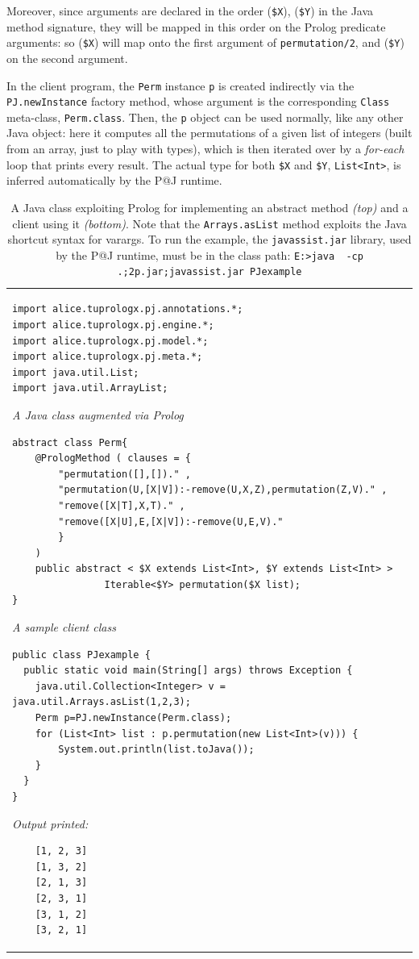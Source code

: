 Moreover, since arguments are declared in the order (\texttt{\$X}), (\texttt{\$Y}) in the Java method signature, they will be mapped in this order on the Prolog predicate arguments: so (\texttt{\$X}) will map onto the first argument of \texttt{permutation/2}, and (\texttt{\$Y}) on the second argument.

In the client program, the \texttt{Perm} instance \texttt{p} is created indirectly via the \texttt{PJ.newInstance} factory method, whose argument is the corresponding \texttt{Class} meta-class, \texttt{Perm.class}.
Then, the \texttt{p} object can be used normally, like any other Java object: here it computes all the permutations of a given list of integers (built from an array, just to play with types), which is then iterated over by a \textit{for-each} loop that prints every result.
The actual type for both \texttt{\$X} and \texttt{\$Y}, \texttt{List<Int>}, is inferred automatically by the P@J runtime.

\begin{table}
{\footnotesize
\begin{tabular}[-1cm]{p{12cm}}
\begin{verbatim}
import alice.tuprologx.pj.annotations.*;
import alice.tuprologx.pj.engine.*;
import alice.tuprologx.pj.model.*;
import alice.tuprologx.pj.meta.*;
import java.util.List;
import java.util.ArrayList;
\end{verbatim}
\textsf{\emph{A Java class augmented via Prolog}}
\begin{verbatim}
abstract class Perm{
    @PrologMethod ( clauses = {
        "permutation([],[])." ,
        "permutation(U,[X|V]):-remove(U,X,Z),permutation(Z,V)." ,
        "remove([X|T],X,T)." ,
        "remove([X|U],E,[X|V]):-remove(U,E,V)."
        }
    )
    public abstract < $X extends List<Int>, $Y extends List<Int> >
                Iterable<$Y> permutation($X list);
}
\end{verbatim}
\textsf{\emph{A sample client class}}
\begin{verbatim}
public class PJexample {
  public static void main(String[] args) throws Exception {
    java.util.Collection<Integer> v = java.util.Arrays.asList(1,2,3);
    Perm p=PJ.newInstance(Perm.class);
    for (List<Int> list : p.permutation(new List<Int>(v))) {
        System.out.println(list.toJava());
    }
  }
}
\end{verbatim}
\textsf{\emph{Output printed:}}
\begin{verbatim}
    [1, 2, 3]
    [1, 3, 2]
    [2, 1, 3]
    [2, 3, 1]
    [3, 1, 2]
    [3, 2, 1]
\end{verbatim}
\end{tabular}
}\caption{A Java class exploiting Prolog for implementing an abstract method \textit{(top)} and a client using it \textit{(bottom)}. Note that the \texttt{Arrays.asList} method exploits the Java shortcut syntax for varargs.
To run the example, the \texttt{javassist.jar} library, used by the P@J runtime, must be in the class path: \texttt{E:>java~~-cp .;2p.jar;javassist.jar PJexample}
}
\label{tab:pj-example1}
\end{table}


